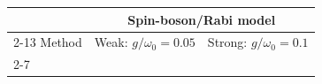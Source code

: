 \documentclass[
  reprint,
  amsmath,
  amssymb,
  aps,
  pra,
  nofootinbib,
  superscriptaddress,
  floatfix
]{revtex4-2}
\begin{document}
\begin{widetext}
\begin{minipage}{\textwidth}
\begin{center}
\footnotesize
\setlength{\tabcolsep}{1.15pt}
\renewcommand{\arraystretch}{1.08}
\begin{ruledtabular}
\begin{tabular}{p{}cccccc|cccccc}
& \multicolumn{12}{c}{Spin-boson/Rabi model}\\
\cline{2-13}
Method & \multicolumn{6}{c|}{Weak: $g/\omega_0=0.05$} & \multicolumn{6}{c}{Strong: $g/\omega_0=0.1$}\\
\cline{2-7}\cline{8-13}

\end{tabular}
\end{ruledtabular}
\end{center}
\end{minipage}
\end{widetext}
\end{document}
